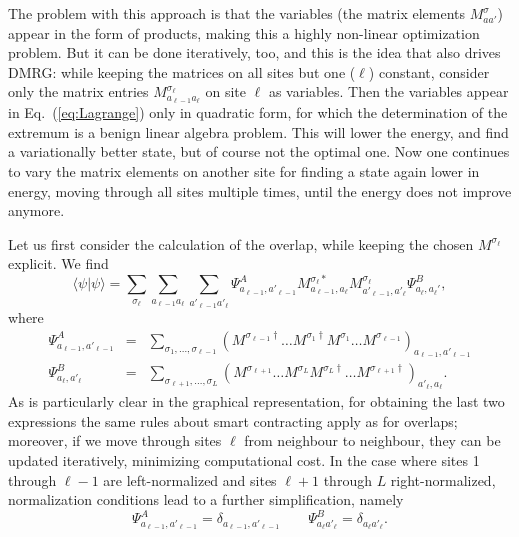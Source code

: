 \documentclass[a4paper,10pt,oneside,onecolumn,1p,times]{elsarticle}
\newcommand{\braket}[2]{\mbox{$\langle #1  | #2 \rangle$}} 	%
\begin{document}
The problem with this approach is that the variables (the matrix elements $M^\sigma_{aa'}$) appear in the form of products, making this a highly non-linear optimization problem. But it can be done iteratively, too, and this is the idea that also drives DMRG: while keeping the matrices on all sites but one ($\ell$) constant, consider only the matrix entries $M^{\sigma_\ell}_{a_{\ell-1}a_\ell}$ on site $\ell$ as variables. Then the variables appear in Eq.~(\ref{eq:Lagrange}) only in quadratic form, for which the determination of the extremum is a benign linear algebra problem. This will lower the energy, and find a variationally better state, but of course not the optimal one. Now one continues to vary the matrix elements on another site for finding a state again lower in energy, moving through all sites multiple times, until the energy does not improve anymore.

Let us first consider the calculation of the overlap, while keeping the chosen $M^{\sigma_\ell}$ explicit. We find 
\begin{equation}
\braket{\psi}{\psi} = \sum_{\sigma_\ell} \sum_{a_{\ell-1}a_{\ell}} \sum_{a'_{\ell-1}a'_{\ell}} \Psi^A_{a_{\ell-1},a'_{\ell-1}} M^{\sigma_\ell*}_{a_{\ell-1}, a_{\ell}} M^{\sigma_\ell}_{a'_{\ell-1}, a'_{\ell}} \Psi^B_{a_\ell, a_\ell'},
\end{equation}
where 
\begin{eqnarray}
\Psi^A_{a_{\ell-1},a'_{\ell-1}} &=& \sum_{\sigma_1,\ldots,\sigma_{\ell-1}} (M^{\sigma_{\ell-1}\dagger} \ldots M^{\sigma_1\dagger} M^{\sigma_1} \ldots M^{\sigma_{\ell-1}})_{a_{\ell-1},a'_{\ell-1}} \\
\Psi^B_{a_\ell, a'_\ell} &=& \sum_{\sigma_{\ell+1},\ldots,\sigma_L} (M^{\sigma_{\ell+1}} \ldots M^{\sigma_L} M^{\sigma_L\dagger} \ldots M^{\sigma_{\ell+1}\dagger})_{a'_\ell,a_\ell} .
\end{eqnarray}
As is particularly clear in the graphical representation, for obtaining the last two expressions the same rules about smart contracting apply as for overlaps; moreover, if we move through sites $\ell$ from neighbour to neighbour, they can be updated iteratively, minimizing computational cost. In the case where sites 1 through $\ell-1$ are left-normalized and sites $\ell+1$ through $L$ right-normalized, normalization conditions lead to a further simplification, namely
\begin{equation} 
\Psi^A_{a_{\ell-1},a'_{\ell-1}} = \delta_{a_{\ell-1},a'_{\ell-1}} \quad\quad  \Psi^B_{a_\ell a'_\ell} = \delta_{a_\ell a'_\ell} .
\end{equation}
\end{document}
